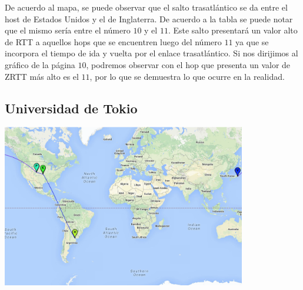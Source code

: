 De acuerdo al mapa, se puede observar que el salto trasatlántico se da entre el host de Estados Unidos y el de Inglaterra. De acuerdo a 
la tabla se puede notar que el mismo sería entre el número $10$ y el $11$. Este salto presentará un valor alto de RTT a aquellos hops que se encuentren luego del número $11$ ya que se incorpora el tiempo de ida y vuelta por el enlace trasatlántico. Si nos dirijimos al gráfico de la página $10$, podremos observar con el hop que presenta un valor de ZRTT más alto es el $11$, por lo que se demuestra lo que ocurre en la realidad.    

\subsection{Universidad de Tokio}
\centerline{\includegraphics[width=0.8\textwidth]{mapas/Japon.png}}

